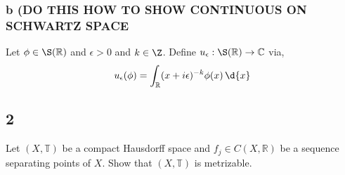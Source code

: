 \documentclass[12pt]{article}
\newcommand{\R}{\mathbb{R}}
\renewcommand{\C}{\mathbb{C}}
\renewcommand{\T}{\mathbb{T}}
\begin{document}
\subsubsection{b (DO THIS HOW TO SHOW CONTINUOUS ON SCHWARTZ SPACE}

Let $\phi \in \S(\R)$ and $\epsilon > 0$ and $k \in \Z$. Define $u_\epsilon : \S(\R) \to \C$ via,
\[ u_\epsilon(\phi) = \int_\R (x + i \epsilon)^{-k} \phi(x) \, \d{x} \]

\subsection{2}

\begin{exercise}
Let $(X, \T)$ be a compact Hausdorff space and $f_j \in C(X, \R)$ be a sequence separating points of $X$. Show that $(X, \T)$ is metrizable.
\end{exercise}
\end{document}
